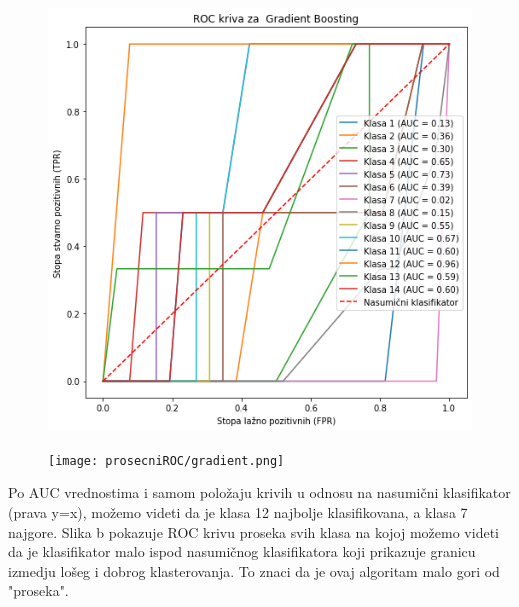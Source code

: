 \documentclass{article}
\begin{document}
\begin{flushleft}
 

\begin{figure}[ht]
    \centering
    \begin{minipage}{0.5\textwidth}
        \centering
        \includegraphics[width=\textwidth]{gradientROC.png}
        \renewcommand{\thefigure}{} 
        \captionsetup{labelformat=empty}
        \label{fig:udeo1}
    \end{minipage}\hfill
    \begin{minipage}{0.5\textwidth}
        \centering
        \texttt{[image: prosecniROC/gradient.png]}
        \renewcommand{\thefigure}{} 
        \captionsetup{labelformat=empty}
        \label{fig:udeo2}
    \end{minipage}
\end{figure}


Po AUC vrednostima i samom položaju krivih u odnosu na nasumični klasifikator (prava y=x), možemo videti da je klasa 12 najbolje klasifikovana, a klasa 7 najgore. Slika b pokazuje ROC krivu proseka svih klasa na kojoj možemo videti da je klasifikator malo ispod nasumičnog klasifikatora koji prikazuje granicu izmedju lošeg i dobrog klasterovanja. To znaci da je ovaj algoritam malo gori od "proseka".

    
\end{flushleft}
\newpage
\vspace{2mm}
\end{document}

